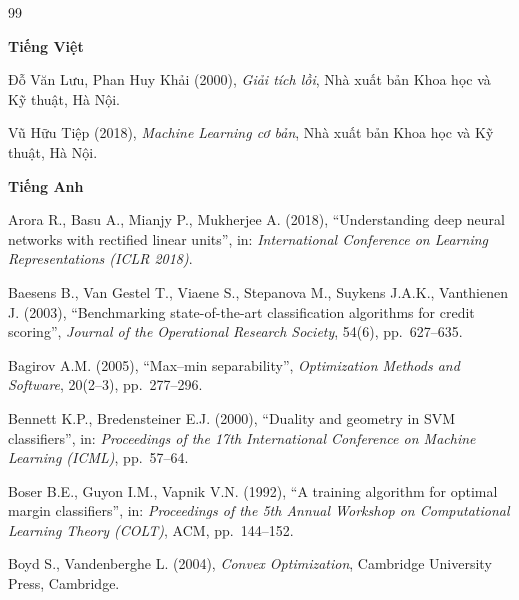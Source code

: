 \renewcommand{\bibname}{TÀI LIỆU THAM KHẢO}
\begingroup
\small
{}
\begin{thebibliography}{99}
\setlength{\itemsep}{2pt}

\item[]\hspace*{-\labelwidth}\hspace*{-\labelsep}\textbf{Tiếng Việt}

 Đỗ Văn Lưu, Phan Huy Khải (2000), \emph{Giải tích lồi}, Nhà xuất bản Khoa học và Kỹ thuật, Hà Nội.

 Vũ Hữu Tiệp (2018), \emph{Machine Learning cơ bản}, Nhà xuất bản Khoa học và Kỹ thuật, Hà Nội.

\item[]\hspace*{-\labelwidth}\hspace*{-\labelsep}\textbf{Tiếng Anh}

 Arora R., Basu A., Mianjy P., Mukherjee A. (2018), “Understanding deep neural networks with rectified linear units”, in: \emph{International Conference on Learning Representations (ICLR 2018)}.

 Baesens B., Van Gestel T., Viaene S., Stepanova M., Suykens J.A.K., Vanthienen J. (2003), “Benchmarking state-of-the-art classification algorithms for credit scoring”, \emph{Journal of the Operational Research Society}, 54(6), pp.~627--635.

 Bagirov A.M. (2005), “Max--min separability”, \emph{Optimization Methods and Software}, 20(2--3), pp.~277--296.

 Bennett K.P., Bredensteiner E.J. (2000), “Duality and geometry in SVM classifiers”, in: \emph{Proceedings of the 17th International Conference on Machine Learning (ICML)}, pp.~57--64.

 Boser B.E., Guyon I.M., Vapnik V.N. (1992), “A training algorithm for optimal margin classifiers”, in: \emph{Proceedings of the 5th Annual Workshop on Computational Learning Theory (COLT)}, ACM, pp.~144--152.

 Boyd S., Vandenberghe L. (2004), \emph{Convex Optimization}, Cambridge University Press, Cambridge.


\end{thebibliography}
